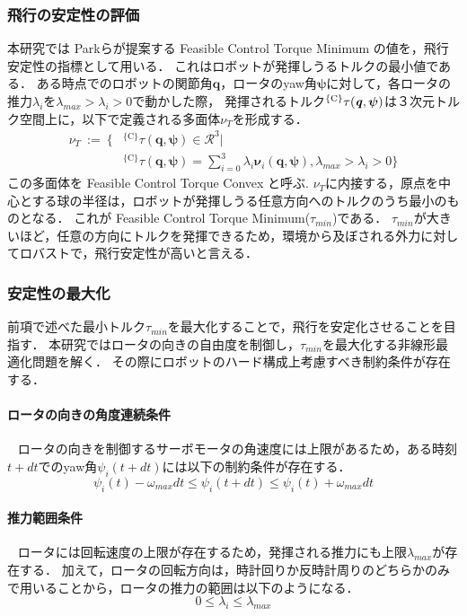 \documentclass{jarticle}
\begin{document}
\subsubsection{飛行の安定性の評価}
本研究では Parkら\cite{FCTMin}が提案する Feasible Control Torque Minimum の値を，飛行安定性の指標として用いる．
これはロボットが発揮しうるトルクの最小値である．
ある時点でのロボットの関節角$\bm{q}$，ロータのyaw角$\bm{\psi}$に対して，各ロータの推力$\lambda_i$を$\lambda_{max} > \lambda_i > 0$で動かした際，
発揮されるトルク$^\text{\{C\}}\tau(\textbf{\textit{q}},\bm{\psi})$は３次元トルク空間上に，以下で定義される多面体$\nu_T$を形成する．
\begin{equation}
    \begin{split}
    \nu_T ~:=~ \Big\{& ^\text{\{C\}}\tau(\bm{q},\bm{\psi}) \in \mathcal{R}^3 | \\
    &^\text{\{C\}} \tau(\bm{q},\bm{\psi}) = \sum_{i=0}^{3} \lambda_i\bm{\nu}_i(\bm{q},\bm{\psi}),  \lambda_{max}>\lambda_i>0   \Big\}
    \end{split}
\end{equation}
この多面体を Feasible Control Torque Convex と呼ぶ.
$\nu_T$に内接する，原点を中心とする球の半径は，ロボットが発揮しうる任意方向へのトルクのうち最小のものとなる．
これが Feasible Control Torque Minimum($\tau_{min}$)である． 
$\tau_{min}$が大きいほど，任意の方向にトルクを発揮できるため，環境から及ぼされる外力に対してロバストで，飛行安定性が高いと言える．

\subsubsection{安定性の最大化}
前項で述べた最小トルク$\tau_{min}$を最大化することで，飛行を安定化させることを目指す．
本研究ではロータの向きの自由度を制御し，$\tau_{min}$を最大化する非線形最適化問題を解く．
その際にロボットのハード構成上考慮すべき制約条件が存在する．

\paragraph{ロータの向きの角度連続条件}
~ ロータの向きを制御するサーボモータの角速度には上限があるため，ある時刻$t+dt$でのyaw角$\psi_i(t+dt)$には以下の制約条件が存在する．
\begin{equation}
    \label{eq:angle_continuity}
    \psi_i(t)-\omega_{max}dt \leq \psi_i(t+dt) \leq \psi_i(t)+\omega_{max}dt
\end{equation}

\paragraph{推力範囲条件}
~ ロータには回転速度の上限が存在するため，発揮される推力にも上限$\lambda_{max}$が存在する．
加えて，ロータの回転方向は，時計回りか反時計周りのどちらかのみで用いることから，ロータの推力の範囲は以下のようになる．
\begin{equation}
    \label{eq:thrust_limit}
    0 \leq \lambda_i \leq \lambda_{max}
\end{equation}
\end{document}
